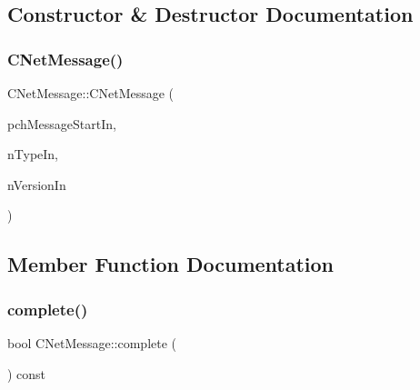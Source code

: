 \subsection{Constructor \& Destructor Documentation}
\mbox{\label{class_c_net_message_a19f23086d183f2f62d0371960b48c105}} 
\subsubsection{\texorpdfstring{C\+Net\+Message()}{CNetMessage()}}
{\footnotesize\ttfamily C\+Net\+Message\+::\+C\+Net\+Message (\begin{DoxyParamCaption}\item[{const \mbox{\hyperlink{class_c_message_header_a0d0eeb540cbf4087973f6652ad61878f}{C\+Message\+Header\+::\+Message\+Start\+Chars}} \&}]{pch\+Message\+Start\+In,  }\item[{int}]{n\+Type\+In,  }\item[{int}]{n\+Version\+In }\end{DoxyParamCaption})\hspace{0.3cm}{\ttfamily [inline]}}



\subsection{Member Function Documentation}
\mbox{\label{class_c_net_message_ae3b5f6110ae9a3c06397894cd46ab224}} 
\subsubsection{\texorpdfstring{complete()}{complete()}}
{\footnotesize\ttfamily bool C\+Net\+Message\+::complete (\begin{DoxyParamCaption}{ }\end{DoxyParamCaption}) const\hspace{0.3cm}{\ttfamily [inline]}}

\mbox{\label{class_c_net_message_adbc1669a56462daea5f37e5e99117f8c}} 
